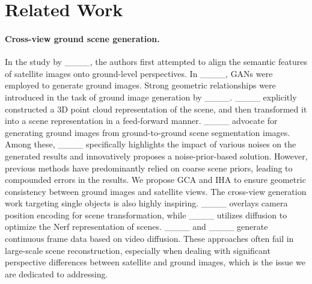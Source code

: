 \section{Related Work}
\paragraph{Cross-view ground scene generation.} 
In the study by ____, the authors first attempted to align the semantic features of satellite images onto ground-level perspectives. In ____, GANs were employed to generate ground images. Strong geometric relationships were introduced in the task of ground image generation by ____. ____ explicitly constructed a 3D point cloud representation of the scene, and then transformed it into a scene representation in a feed-forward manner. ____ advocate for generating ground images from ground-to-ground scene segmentation images. Among these, ____ specifically highlights the impact of various noises on the generated results and innovatively proposes a noise-prior-based solution. However, previous methods have predominantly relied on coarse scene priors, leading to compounded errors in the results. We propose GCA and IHA to ensure geometric consistency between ground images and satellite views. 
The cross-view generation work targeting single objects is also highly inspiring. ____ overlays camera position encoding for scene transformation, while ____ utilizes diffusion to optimize the Nerf representation of scenes. ____ and ____ generate continuous frame data based on video diffusion. These approaches often fail in large-scale scene reconstruction, especially when dealing with significant perspective differences between satellite and ground images, which is the issue we are dedicated to addressing.

